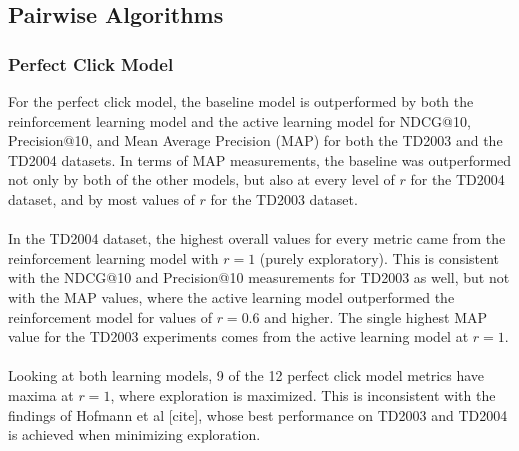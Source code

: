 \documentclass{acm_proc_article-sp}
\begin{document}
\subsection{Pairwise Algorithms}
\subsubsection{Perfect Click Model}
For the perfect click model, the baseline model is outperformed by both the reinforcement learning model and the active learning model for NDCG@10, Precision@10, and Mean Average Precision (MAP) for both the TD2003 and the TD2004 datasets.  In terms of MAP measurements, the baseline was outperformed not only by both of the other models, but also at every level of $r$ for the TD2004 dataset, and by most values of $r$ for the TD2003 dataset.  \\ \\
In the TD2004 dataset, the highest overall values for every metric came from the reinforcement learning model with $r=1$ (purely exploratory).  This is consistent with the NDCG@10 and Precision@10 measurements for TD2003 as well, but not with the MAP values, where the active learning model outperformed the reinforcement model for values of $r=0.6$ and higher.  The single highest MAP value for the TD2003 experiments comes from the active learning model at $r=1$.   \\ \\
Looking at both learning models, 9 of the 12 perfect click model metrics have maxima at $r=1$, where exploration is maximized.  This is inconsistent with the findings of Hofmann et al [cite], whose best performance on TD2003 and TD2004 is achieved when minimizing exploration.  \\ \\
\end{document}

